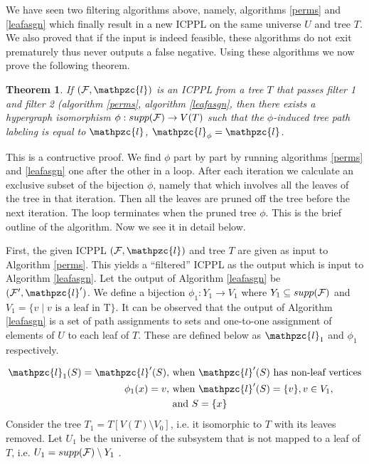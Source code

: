 \documentclass{CRPITStyle} %
\def\cF{{\cal F}}
\def\cl{\mathpzc{l}}
\def\xnoindent{} %
\newtheorem{theorem}{Theorem}[section] %
\newenvironment{proof}[1][Proof]{\begin{trivlist} %
\item[\hskip \labelsep {\bfseries #1}]}{\end{trivlist}} %
\begin{document}
\xnoindent
We have seen two filtering algorithms above, namely, algorithms
\ref{perms} and \ref{leafasgn} which finally result in a new ICPPL on
the same universe $U$ and tree $T$. We also proved that if the input
is indeed feasible, these algorithms do not exit prematurely thus
never outputs a false negative.  Using these algorithms we now prove
the following theorem.

\begin{theorem}
  \label{th:perm}
  If $(\cF, \cl)$ is an ICPPL from a tree $T$ that passes filter 1 and
  filter 2 (algorithm \ref{perms}, algorithm \ref{leafasgn}, then there exists a
  hypergraph isomorphism $\phi : supp(\cF) \rightarrow V(T)$ such that
  the $\phi$-induced tree path labeling is equal to $\cl$, $\cl_\phi =
  \cl$.
\end{theorem}
\begin{proof}
  This is a contructive proof. We find $\phi$ part by part by running
  algorithms \ref{perms} and \ref{leafasgn} one after the other in a
  loop. After each iteration we calculate an exclusive subset of the
  bijection $\phi$, namely that which involves all the leaves of the
  tree in that iteration. Then all the leaves are pruned off the tree
  before the next iteration. The loop terminates when the pruned tree
   $\phi$. This is the
  brief outline of the algorithm. Now we see it in detail below.

 \xnoindent First, the given ICPPL $(\cF, \cl)$ and tree $T$ are
  given as input to Algorithm \ref{perms}. This yields a ``filtered''
  ICPPL as the output which is input to Algorithm \ref{leafasgn}.  Let
  the output of Algorithm \ref{leafasgn} be $(\cF',\cl')$. We define a
  bijection $\phi_1: Y_1 \rightarrow V_1$ where $Y_1 \subseteq
  supp(\cF)$ and $V_1 = \{v \mid v \text{ is a leaf in } $T$\}$.  It
  can be observed that the output of Algorithm \ref{leafasgn} is a set
  of path assignments to sets and one-to-one assignment of elements of
  $U$ to each leaf of $T$. These are defined below as $\cl_1$ and
  $\phi_1$ respectively.

  \begin{align*}
    \cl_1(S) = \cl'(S), &\text{ when $\cl'(S)$ has non-leaf vertices} \\
    \phi_1(x) = v,  &\text{ when }\cl'(S) = \{v\}, v \in V_1,\\
    &\text{ and } S = \{x\}
  \end{align*}
  Consider the tree $T_1 = T[V(T) \setminus V_0]$, i.e. it isomorphic
  to $T$ with its leaves removed. Let $U_1$ be the universe of the
  subsystem that is not mapped to a leaf of $T$, i.e. $U_1 = supp(\cF)
  \setminus Y_1$ .


\end{proof}
\end{document}
